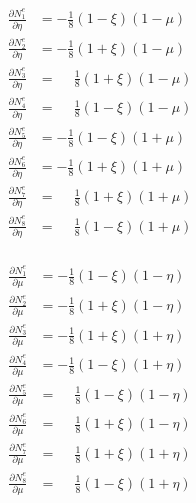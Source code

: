 \documentclass[10pt,b5paper,titlepage]{book}
\newenvironment{eqarray}
{
    \begin{eqnarray}
        \begin{aligned}
}
{
        \end{aligned}
    \end{eqnarray}
}
\begin{document}
\begin{eqarray}
    \frac{\partial N_1^e}{\partial\eta} &= -\frac{1}{8} \left(1-\xi\right) \left(1-\mu\right)\\
    \frac{\partial N_2^e}{\partial\eta} &= -\frac{1}{8} \left(1+\xi\right) \left(1-\mu\right)\\
    \frac{\partial N_3^e}{\partial\eta} &= \phantom{-}\frac{1}{8} \left(1+\xi\right) \left(1-\mu\right)\\
    \frac{\partial N_4^e}{\partial\eta} &= \phantom{-}\frac{1}{8} \left(1-\xi\right) \left(1-\mu\right)\\
    \frac{\partial N_5^e}{\partial\eta} &= -\frac{1}{8} \left(1-\xi\right) \left(1+\mu\right)\\
    \frac{\partial N_6^e}{\partial\eta} &= -\frac{1}{8} \left(1+\xi\right) \left(1+\mu\right)\\
    \frac{\partial N_7^e}{\partial\eta} &= \phantom{-}\frac{1}{8} \left(1+\xi\right) \left(1+\mu\right)\\
    \frac{\partial N_8^e}{\partial\eta} &= \phantom{-}\frac{1}{8} \left(1-\xi\right) \left(1+\mu\right)
\end{eqarray}

\begin{eqarray}
    \frac{\partial N_1^e}{\partial\mu} &= -\frac{1}{8} \left(1-\xi\right) \left(1-\eta\right)\\
    \frac{\partial N_2^e}{\partial\mu} &= -\frac{1}{8} \left(1+\xi\right) \left(1-\eta\right)\\
    \frac{\partial N_3^e}{\partial\mu} &= -\frac{1}{8} \left(1+\xi\right) \left(1+\eta\right)\\
    \frac{\partial N_4^e}{\partial\mu} &= -\frac{1}{8} \left(1-\xi\right) \left(1+\eta\right)\\
    \frac{\partial N_5^e}{\partial\mu} &= \phantom{-}\frac{1}{8} \left(1-\xi\right) \left(1-\eta\right)\\
    \frac{\partial N_6^e}{\partial\mu} &= \phantom{-}\frac{1}{8} \left(1+\xi\right) \left(1-\eta\right)\\
    \frac{\partial N_7^e}{\partial\mu} &= \phantom{-}\frac{1}{8} \left(1+\xi\right) \left(1+\eta\right)\\
    \frac{\partial N_8^e}{\partial\mu} &= \phantom{-}\frac{1}{8} \left(1-\xi\right) \left(1+\eta\right)
\end{eqarray}
\end{document}
